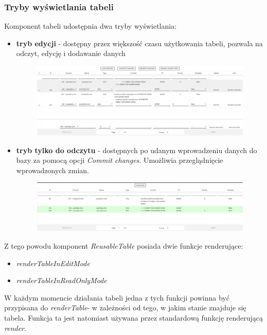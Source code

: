 \documentclass[11pt]{article}
\begin{document}
\subsubsection{Tryby wyświetlania tabeli}
Komponent tabeli udostępnia dwa tryby wyświetlania:
\begin{itemize}
\item \textbf{tryb edycji} - dostępny przez większość czasu użytkowania tabeli, pozwala na odczyt, edycję i dodawanie danych
\begin{figure}[H]
\centering
\includegraphics[width=\textwidth]{res/front_tabela_edit}
\end{figure}
\item \textbf{tryb tylko do odczytu} - dostępnych po udanym wprowadzeniu danych do bazy za pomocą opcji \emph{Commit changes}. Umożliwia przeglądnięcie wprowadzonych zmian.
\begin{figure}[H]
\centering
\includegraphics[width=\textwidth]{res/front_tabela_commit}
\end{figure}
\end{itemize}
Z tego powodu komponent \emph{ReusableTable} posiada dwie funkcje renderujące:
\begin{itemize}
\item \emph{renderTableInEditMode}
\item \emph{renderTableInReadOnlyMode}
\end{itemize}
W każdym momencie działania tabeli jedna z tych funkcji powinna być przypisana do \emph{renderTable}- w zależności od tego, w jakim stanie znajduje się tabela. Funkcja ta jest natomiast używana przez standardową funkcję renderującą \emph{render}.
\end{document}
